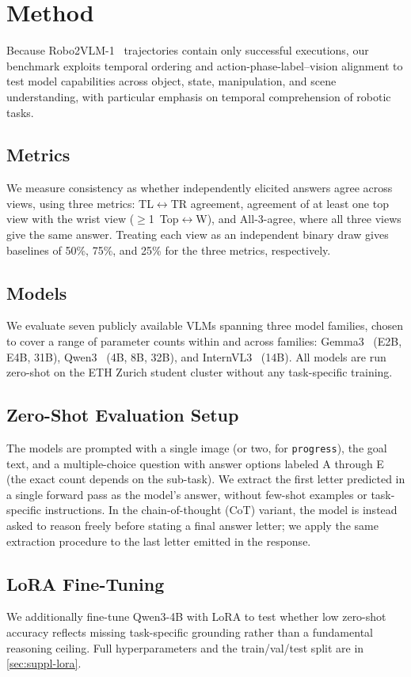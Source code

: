 \section{Method}
\label{sec:method}

Because Robo2VLM-1~\cite{chen2025robo2vlm} trajectories contain only successful executions, our benchmark exploits temporal ordering and action-phase-label--vision alignment to test model capabilities across object, state, manipulation, and scene understanding, with particular emphasis on temporal comprehension of robotic tasks.

\subsection{Metrics}
We measure consistency as whether
independently elicited answers agree across views, using three metrics: TL$\leftrightarrow$TR
agreement, agreement of at least one top view with the wrist view
($\geq$1~Top$\leftrightarrow$W), and All-3-agree, where all three views give the same
answer. Treating each view as an independent binary draw gives baselines of 50\%, 75\%,
and 25\% for the three metrics, respectively.

\subsection{Models}
We evaluate seven publicly available VLMs spanning three model families, chosen to cover
a range of parameter counts within and across families: Gemma3~\cite{gemma2025gemma3}
(E2B, E4B, 31B), Qwen3~\cite{qwen2025qwen3} (4B, 8B, 32B), and
InternVL3~\cite{chen2025internvl3} (14B). All models are run zero-shot on the ETH Zurich
student cluster without any task-specific training.

\subsection{Zero-Shot Evaluation Setup}
The models are prompted with a single image (or two, for \texttt{progress}), the goal
text, and a multiple-choice question with answer options labeled A through E (the exact
count depends on the sub-task). We extract the first letter predicted in a single forward
pass as the model's answer, without few-shot examples or task-specific instructions. In
the chain-of-thought (CoT) variant, the model is instead asked to reason freely before
stating a final answer letter; we apply the same extraction procedure to the last letter
emitted in the response. 

\subsection{LoRA Fine-Tuning}
We additionally fine-tune Qwen3-4B with LoRA \cite{Hu2021} to test whether low zero-shot accuracy
reflects missing task-specific grounding rather than a fundamental reasoning ceiling.
Full hyperparameters and the train/val/test split are in \cref{sec:suppl-lora}.
